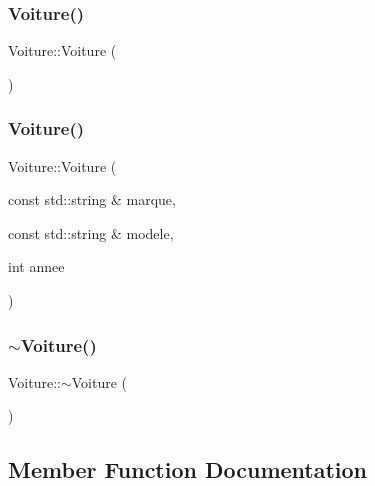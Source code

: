 \subsubsection{\texorpdfstring{Voiture()}{Voiture()}\hspace{0.1cm}{\footnotesize\ttfamily [1/2]}}
{\footnotesize\ttfamily Voiture\+::\+Voiture (\begin{DoxyParamCaption}{ }\end{DoxyParamCaption})\hspace{0.3cm}{\ttfamily [inline]}}

\mbox{\label{classVoiture_a19c0ef4e204cf46085252606f1118cbd}} 
\subsubsection{\texorpdfstring{Voiture()}{Voiture()}\hspace{0.1cm}{\footnotesize\ttfamily [2/2]}}
{\footnotesize\ttfamily Voiture\+::\+Voiture (\begin{DoxyParamCaption}\item[{const std\+::string \&}]{marque,  }\item[{const std\+::string \&}]{modele,  }\item[{int}]{annee }\end{DoxyParamCaption})}

\mbox{\label{classVoiture_afe85820a993b6908d0fdb524245e5133}} 
\subsubsection{\texorpdfstring{$\sim$\+Voiture()}{~Voiture()}}
{\footnotesize\ttfamily Voiture\+::$\sim$\+Voiture (\begin{DoxyParamCaption}{ }\end{DoxyParamCaption})}



\subsection{Member Function Documentation}
\mbox{\label{classVoiture_abcfb02d479b44ffd338bf5aa52344fff}} 
